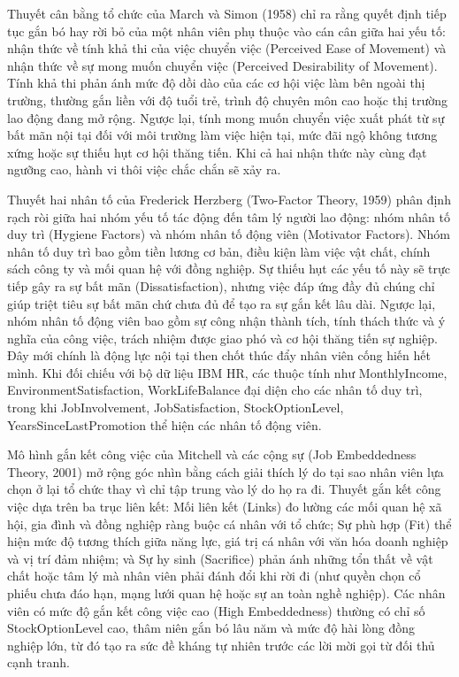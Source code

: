 \documentclass[12pt,a4paper]{article}
\begin{document}
Thuyết cân bằng tổ chức của March và Simon (1958) chỉ ra rằng quyết định tiếp tục gắn bó hay rời bỏ của một nhân viên phụ thuộc vào cán cân giữa hai yếu tố: nhận thức về tính khả thi của việc chuyển việc (Perceived Ease of Movement) và nhận thức về sự mong muốn chuyển việc (Perceived Desirability of Movement). Tính khả thi phản ánh mức độ dồi dào của các cơ hội việc làm bên ngoài thị trường, thường gắn liền với độ tuổi trẻ, trình độ chuyên môn cao hoặc thị trường lao động đang mở rộng. Ngược lại, tính mong muốn chuyển việc xuất phát từ sự bất mãn nội tại đối với môi trường làm việc hiện tại, mức đãi ngộ không tương xứng hoặc sự thiếu hụt cơ hội thăng tiến. Khi cả hai nhận thức này cùng đạt ngưỡng cao, hành vi thôi việc chắc chắn sẽ xảy ra.

Thuyết hai nhân tố của Frederick Herzberg (Two-Factor Theory, 1959) phân định rạch ròi giữa hai nhóm yếu tố tác động đến tâm lý người lao động: nhóm nhân tố duy trì (Hygiene Factors) và nhóm nhân tố động viên (Motivator Factors). Nhóm nhân tố duy trì bao gồm tiền lương cơ bản, điều kiện làm việc vật chất, chính sách công ty và mối quan hệ với đồng nghiệp. Sự thiếu hụt các yếu tố này sẽ trực tiếp gây ra sự bất mãn (Dissatisfaction), nhưng việc đáp ứng đầy đủ chúng chỉ giúp triệt tiêu sự bất mãn chứ chưa đủ để tạo ra sự gắn kết lâu dài. Ngược lại, nhóm nhân tố động viên bao gồm sự công nhận thành tích, tính thách thức và ý nghĩa của công việc, trách nhiệm được giao phó và cơ hội thăng tiến sự nghiệp. Đây mới chính là động lực nội tại then chốt thúc đẩy nhân viên cống hiến hết mình. Khi đối chiếu với bộ dữ liệu IBM HR, các thuộc tính như MonthlyIncome, EnvironmentSatisfaction, WorkLifeBalance đại diện cho các nhân tố duy trì, trong khi JobInvolvement, JobSatisfaction, StockOptionLevel, YearsSinceLastPromotion thể hiện các nhân tố động viên.

Mô hình gắn kết công việc của Mitchell và các cộng sự (Job Embeddedness Theory, 2001) mở rộng góc nhìn bằng cách giải thích lý do tại sao nhân viên lựa chọn ở lại tổ chức thay vì chỉ tập trung vào lý do họ ra đi. Thuyết gắn kết công việc dựa trên ba trục liên kết: Mối liên kết (Links) đo lường các mối quan hệ xã hội, gia đình và đồng nghiệp ràng buộc cá nhân với tổ chức; Sự phù hợp (Fit) thể hiện mức độ tương thích giữa năng lực, giá trị cá nhân với văn hóa doanh nghiệp và vị trí đảm nhiệm; và Sự hy sinh (Sacrifice) phản ánh những tổn thất về vật chất hoặc tâm lý mà nhân viên phải đánh đổi khi rời đi (như quyền chọn cổ phiếu chưa đáo hạn, mạng lưới quan hệ hoặc sự an toàn nghề nghiệp). Các nhân viên có mức độ gắn kết công việc cao (High Embeddedness) thường có chỉ số StockOptionLevel cao, thâm niên gắn bó lâu năm và mức độ hài lòng đồng nghiệp lớn, từ đó tạo ra sức đề kháng tự nhiên trước các lời mời gọi từ đối thủ cạnh tranh.
\end{document}
